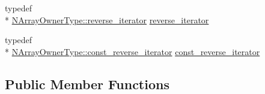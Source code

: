 \begin{DoxyCompactItemize}
\item 
typedef \\*
\hyperlink{classvct_dynamic_n_array_ref_owner_aabd87b1efc3a18043c6dac3d8017be59}{N\-Array\-Owner\-Type\-::reverse\-\_\-iterator} \hyperlink{classvct_dynamic_n_array_ref_a94a5409f7d94313da64fc744ddd2b484}{reverse\-\_\-iterator}
\item 
typedef \\*
\hyperlink{classvct_dynamic_n_array_ref_owner_ade444e0883b2420a8a113171b6e49bf4}{N\-Array\-Owner\-Type\-::const\-\_\-reverse\-\_\-iterator} \hyperlink{classvct_dynamic_n_array_ref_acbbabce9e90157699716c48667704b2a}{const\-\_\-reverse\-\_\-iterator}
\end{DoxyCompactItemize}
\subsection*{Public Member Functions}
